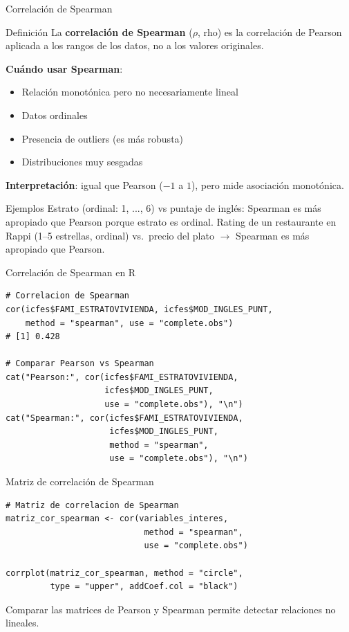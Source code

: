 \documentclass[aspectratio=169, 11pt]{beamer}
\begin{document}
\begin{frame}{Correlación de Spearman}
\begin{block}{Definición}
La \textbf{correlación de Spearman} ($\rho$, rho) es la correlación de Pearson aplicada a los \alert{rangos} de los datos, no a los valores originales.
\end{block}

\textbf{Cuándo usar Spearman}:
\begin{itemize}
\item Relación monotónica pero no necesariamente lineal
\item Datos ordinales
\item Presencia de outliers (es más robusta)
\item Distribuciones muy sesgadas
\end{itemize}

\textbf{Interpretación}: igual que Pearson ($-1$ a $1$), pero mide asociación monotónica.

\vspace{0.3em}
\begin{exampleblock}{Ejemplos}
Estrato (ordinal: 1, ..., 6) vs puntaje de ingl\'es: Spearman es m\'as apropiado que Pearson porque estrato es ordinal.
Rating de un restaurante en Rappi (1--5 estrellas, ordinal) vs.\ precio del plato $\to$ Spearman es m\'as apropiado que Pearson.
\end{exampleblock}
\end{frame}

\begin{frame}[fragile]{Correlación de Spearman en R}
\begin{lstlisting}
# Correlacion de Spearman
cor(icfes$FAMI_ESTRATOVIVIENDA, icfes$MOD_INGLES_PUNT,
    method = "spearman", use = "complete.obs")
# [1] 0.428

# Comparar Pearson vs Spearman
cat("Pearson:", cor(icfes$FAMI_ESTRATOVIVIENDA,
                    icfes$MOD_INGLES_PUNT,
                    use = "complete.obs"), "\n")
cat("Spearman:", cor(icfes$FAMI_ESTRATOVIVIENDA,
                     icfes$MOD_INGLES_PUNT,
                     method = "spearman",
                     use = "complete.obs"), "\n")
\end{lstlisting}
\end{frame}

\begin{frame}[fragile]{Matriz de correlación de Spearman}
\begin{lstlisting}
# Matriz de correlacion de Spearman
matriz_cor_spearman <- cor(variables_interes,
                            method = "spearman",
                            use = "complete.obs")

corrplot(matriz_cor_spearman, method = "circle",
         type = "upper", addCoef.col = "black")
\end{lstlisting}

Comparar las matrices de Pearson y Spearman permite detectar relaciones no lineales.
\end{frame}
\end{document}
